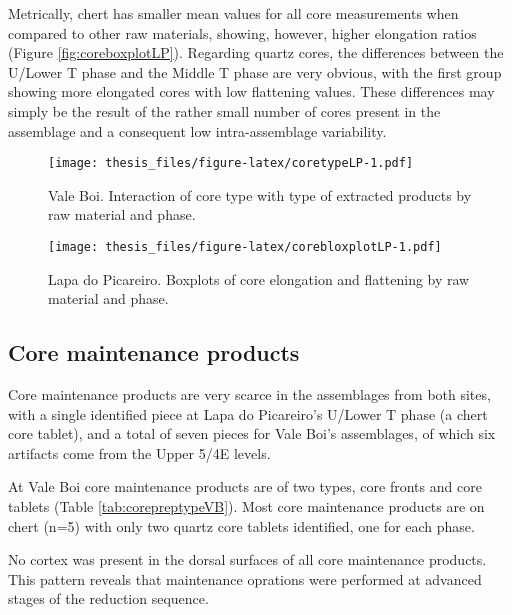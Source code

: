 \documentclass[12pt,twoside]{reedthesis}
\begin{document}
Metrically, chert has smaller mean values for all core measurements when compared to other raw materials, showing, however, higher elongation ratios (Figure \ref{fig:coreboxplotLP}). Regarding quartz cores, the differences between the U/Lower T phase and the Middle T phase are very obvious, with the first group showing more elongated cores with low flattening values. These differences may simply be the result of the rather small number of cores present in the assemblage and a consequent low intra-assemblage variability.
\begin{figure}
\centering
\texttt{[image: thesis\_files/figure-latex/coretypeLP-1.pdf]}
\caption{\label{fig:coretypeLP}Vale Boi. Interaction of core type with type of extracted products by raw material and phase.}
\end{figure}
\begin{figure}
\centering
\texttt{[image: thesis\_files/figure-latex/corebloxplotLP-1.pdf]}
\caption{\label{fig:corebloxplotLP}Lapa do Picareiro. Boxplots of core elongation and flattening by raw material and phase.}
\end{figure}
\hypertarget{core-maintenance-products}{%
\subsection{Core maintenance products}\label{core-maintenance-products}}

Core maintenance products are very scarce in the assemblages from both sites, with a single identified piece at Lapa do Picareiro's U/Lower T phase (a chert core tablet), and a total of seven pieces for Vale Boi's assemblages, of which six artifacts come from the Upper 5/4E levels.

At Vale Boi core maintenance products are of two types, core fronts and core tablets (Table \ref{tab:corepreptypeVB}). Most core maintenance products are on chert (n=5) with only two quartz core tablets identified, one for each phase.

No cortex was present in the dorsal surfaces of all core maintenance products. This pattern reveals that maintenance oprations were performed at advanced stages of the reduction sequence.
\end{document}
